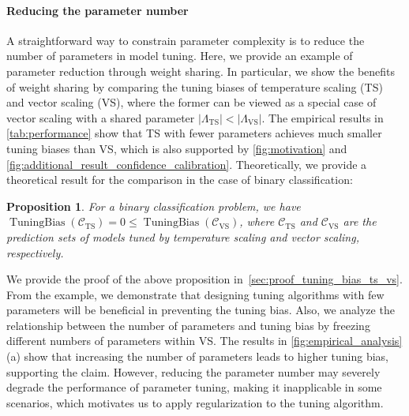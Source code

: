 \documentclass{article}
\newcommand{\1}{\mathbbm{1}}
\newcommand{\TuningBias}{\mathop{\text{TuningBias}}}
\theoremstyle{plain}
\newtheorem{proposition}[theorem]{Proposition}
\theoremstyle{definition}
\theoremstyle{remark}
\begin{document}
\paragraph{Reducing the parameter number}
A straightforward way to constrain parameter complexity is to reduce the number of parameters in model tuning. 
Here, we provide an example of parameter reduction through weight sharing. 
In particular, we show the benefits of weight sharing by comparing the tuning biases of temperature scaling (TS) and vector scaling (VS), where the former can be viewed as a special case of vector scaling with a shared parameter $|\Lambda_{\mathrm{TS}}|<|\Lambda_{\mathrm{VS}}|$.
The empirical results in \cref{tab:performance} show that TS with fewer parameters achieves much smaller tuning biases than VS\@, which is also supported by \cref{fig:motivation} and \cref{fig:additional_result_confidence_calibration}.
Theoretically, we provide a theoretical result for the comparison in the case of binary classification:
\begin{proposition}
    \label{prop:tuning_bias_ts_vs}
    For a binary classification problem, we have $\TuningBias({\mathcal{C}}_{\text{TS}}) = 0 \leq \TuningBias({\mathcal{C}}_{\text{VS}})$,  
    where ${\mathcal{C}}_{\text{TS}}$ and ${\mathcal{C}}_{\text{VS}}$ are the prediction sets of models tuned by temperature scaling and vector scaling, respectively.
\end{proposition}
We provide the proof of the above proposition in~\cref{sec:proof_tuning_bias_ts_vs}. 
From the example, we demonstrate that designing tuning algorithms with few parameters will be beneficial in preventing the tuning bias.
Also, we analyze the relationship between the number of parameters and tuning bias by freezing different numbers of parameters within VS\@. 
The results in \cref{fig:empirical_analysis} (a) show that increasing the number of parameters leads to higher tuning bias, supporting the claim.
However, reducing the parameter number may severely degrade the performance of parameter tuning, making it inapplicable in some scenarios, which motivates us to apply regularization to the tuning algorithm.
\end{document}
